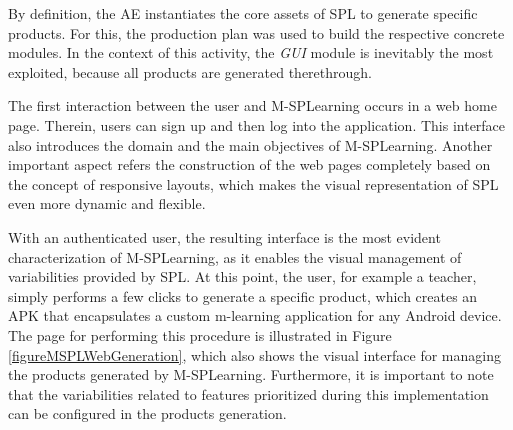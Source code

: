 By definition, the AE instantiates the core assets of SPL to generate specific products. For this, the production plan was used to build the respective concrete modules. In the context of this activity, the \textit{GUI} module is inevitably the most exploited, because all products are generated therethrough.

The first interaction between the user and M-SPLearning occurs in a web home page. Therein, users can sign up and then log into the application. This interface also introduces the domain and the main objectives of M-SPLearning. Another important aspect refers the construction of the web pages completely based on the concept of responsive layouts, which makes the visual representation of SPL even more dynamic and flexible. 

%

With an authenticated user, the resulting interface is the most evident characterization of M-SPLearning, as it enables the visual management of variabilities provided by SPL. At this point, the user, for example a teacher, simply performs a few clicks to generate a specific product, which creates an APK that encapsulates a custom m-learning application for any Android device. The page for performing this procedure is illustrated in Figure \ref{figureMSPLWebGeneration}, which also shows the visual interface for managing the products generated by M-SPLearning. Furthermore, it is important to note that the variabilities related to features prioritized during this implementation can be configured in the products generation.

